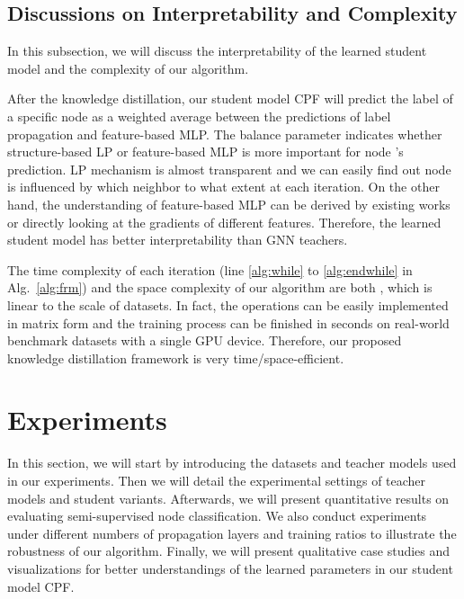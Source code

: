 \documentclass[sigconf]{acmart}
\begin{document}
\subsection{Discussions on Interpretability and Complexity}
\label{sec:discuss}
In this subsection, we will discuss the interpretability of the learned student model and the complexity of our algorithm.

After the knowledge distillation, our student model CPF will predict the label of a specific node  as a weighted average between the predictions of label propagation and feature-based MLP. The balance parameter  indicates whether structure-based LP or feature-based MLP is more important for node 's prediction. LP mechanism is almost transparent and we can easily find out node  is influenced by which neighbor to what extent at each iteration. On the other hand, the understanding of feature-based MLP can be derived by existing works~\cite{ribeiro2016should} or directly looking at the gradients of different features. Therefore, the learned student model has better interpretability than GNN teachers.

The time complexity of each iteration (line \ref{alg:while} to \ref{alg:endwhile} in Alg.~\ref{alg:frm}) and the space complexity of our algorithm are both , which is linear to the scale of datasets. In fact, the operations can be easily implemented in matrix form and the training process can be finished in seconds on real-world benchmark datasets with a single GPU device. Therefore, our proposed knowledge distillation framework is very time/space-efficient.

\section{Experiments}
\label{sec:exp}
In this section, we will start by introducing the datasets and teacher models used in our experiments. Then we will detail the experimental settings of teacher models and student variants. Afterwards, we will present quantitative results on evaluating semi-supervised node classification. We also conduct experiments under different numbers of propagation layers and training ratios to illustrate the robustness of our algorithm. Finally, we will present qualitative case studies and visualizations for better understandings of the learned parameters in our student model CPF.
\end{document}
